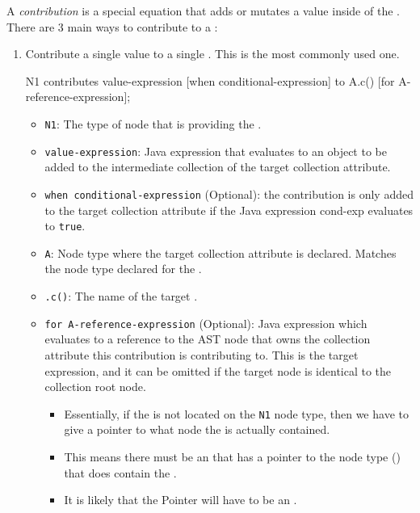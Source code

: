 \begin{definition}[Contribution]\label{def:Contribution}
  A \emph{contribution} is a special equation that adds or mutates a value inside of the .
  There are 3 main ways to contribute to a :
  \begin{enumerate}[noitemsep]
  \item Contribute a single value to a single . This is the most commonly used one.
\begin{javasource}
  N1 contributes value-expression
    [when conditional-expression]
    to A.c()
    [for A-reference-expression];
\end{javasource}
    \begin{itemize}[noitemsep]
    \item \texttt{N1}: The type of  node that is providing the .
    \item \texttt{value-expression}: Java expression that evaluates to an object to be added to the intermediate collection of the target collection attribute.
    \item \texttt{when conditional-expression} (Optional): the contribution is only added to the target collection attribute if the Java expression cond-exp evaluates to \texttt{true}.
    \item \texttt{A}: Node type where the target collection attribute is declared. Matches the node type declared for the .
    \item \texttt{.c()}: The name of the target .
    \item \texttt{for A-reference-expression} (Optional): Java expression which evaluates to a reference to the AST node that owns the collection attribute this contribution is contributing to.
      This is the target expression, and it can be omitted if the target node is identical to the collection root node.
      \begin{itemize}[noitemsep]
      \item Essentially, if the  is not located on the \texttt{N1} node type, then we have to give a pointer to what node the  is actually contained.
      \item This means there must be an  that has a pointer to the node type () that does contain the .
      \item It is likely that the Pointer will have to be an .
      \end{itemize}
    \end{itemize}


\end{enumerate}
\end{definition}
